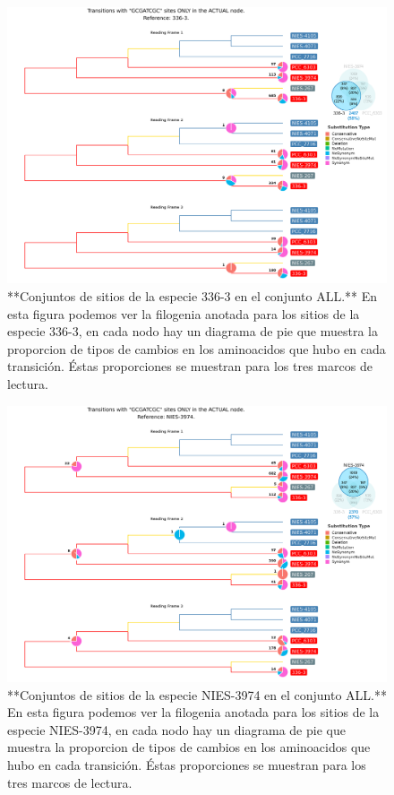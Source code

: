 \documentclass[
]{book}
\begin{document}
\begin{figure}

{\centering \includegraphics[width=1.2\linewidth]{Clados/Calothrix_B/figures/A/GCGATCGC/Actual/336-3_Actual_A_tree} 

}

\caption{**Conjuntos de sitios de la especie 336-3 en el conjunto ALL.** En esta figura podemos ver la filogenia anotada para los sitios de la especie 336-3, en cada nodo hay un diagrama de pie que muestra la proporcion de tipos de cambios en los aminoacidos que hubo en cada transición. Éstas proporciones se muestran para los tres marcos de lectura.}\label{fig:FIG13}
\end{figure}

\begin{figure}

{\centering \includegraphics[width=1.2\linewidth]{Clados/Calothrix_B/figures/A/GCGATCGC/Actual/NIES-3974_Actual_A_tree} 

}

\caption{**Conjuntos de sitios de la especie NIES-3974 en el conjunto ALL.** En esta figura podemos ver la filogenia anotada para los sitios de la especie NIES-3974, en cada nodo hay un diagrama de pie que muestra la proporcion de tipos de cambios en los aminoacidos que hubo en cada transición. Éstas proporciones se muestran para los tres marcos de lectura.}\label{fig:FIG14}
\end{figure}
\end{document}
